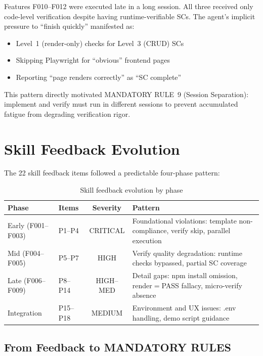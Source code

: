 \documentclass[11pt,a4paper,openright,twoside]{report}
\begin{document}
Features F010--F012 were executed late in a long session. All three received only code-level verification despite having runtime-verifiable SCs. The agent's implicit pressure to ``finish quickly'' manifested as:

\begin{itemize}[nosep]
  \item Level~1 (render-only) checks for Level~3 (CRUD) SCs
  \item Skipping Playwright for ``obvious'' frontend pages
  \item Reporting ``page renders correctly'' as ``SC complete''
\end{itemize}

This pattern directly motivated MANDATORY RULE~9 (Session Separation): implement and verify must run in different sessions to prevent accumulated fatigue from degrading verification rigor.

\section{Skill Feedback Evolution}

The 22 skill feedback items followed a predictable four-phase pattern:

\begin{table}[H]
\centering
\caption{Skill feedback evolution by phase}
\label{tab:aegis-feedback}
\begin{tabularx}{\textwidth}{llcX}
\toprule
\textbf{Phase} & \textbf{Items} & \textbf{Severity} & \textbf{Pattern} \\
\midrule
Early (F001--F003) & P1--P4 & CRITICAL & Foundational violations: template non-compliance, verify skip, parallel execution \\
Mid (F004--F005) & P5--P7 & HIGH & Verify quality degradation: runtime checks bypassed, partial SC coverage \\
Late (F006--F009) & P8--P14 & HIGH--MED & Detail gaps: npm install omission, render$=$PASS fallacy, micro-verify absence \\
Integration & P15--P18 & MEDIUM & Environment and UX issues: .env handling, demo script guidance \\
\bottomrule
\end{tabularx}
\end{table}

\subsection{From Feedback to MANDATORY RULES}
\end{document}
